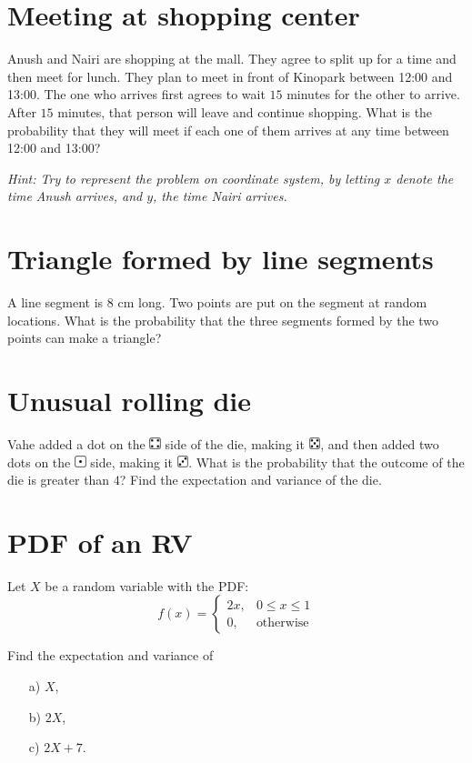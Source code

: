 \section{Meeting at shopping center}
Anush and Nairi are shopping at the mall. They agree to split up for a time and then meet for lunch. They plan to meet in
front of Kinopark between 12:00 and 13:00. The one who arrives first agrees to wait $15$ minutes for the other to arrive. After $15$
minutes, that person will leave and continue shopping. What is the probability that they will meet if each one of them arrives at any time between 12:00 and 13:00?

\textit{Hint: Try to represent the problem on coordinate system, by letting
$x$ denote the time Anush arrives, and $y$, the time Nairi arrives.}

\section{Triangle formed by line segments}
A line segment is $8$ cm long. Two points are put on the segment at
random locations. What is the probability that the three segments formed by
the two points can make a triangle?

\section{Unusual rolling die}
Vahe added a dot on the   \includegraphics[height=0.9em]{figs/4.png} side of the die, making it \includegraphics[height=0.9em]{figs/5.png}, and then added two dots on the \includegraphics[height=0.9em]{figs/1.png} side, making it \includegraphics[height=0.9em]{figs/3.png}.
What is the probability that the outcome of the die is greater than $4$? Find the expectation and variance of the die.

\section{PDF of an RV}
Let $X$ be a random variable with the PDF:
\[
f(x) = \begin{cases}
   2x, & 0 \le x \le 1 \\
   0, & \text{otherwise}
\end{cases}
\]

Find the expectation and variance of
\begin{enumerate}
   \item[a) ] $X$,
   \item[b) ] $2X$,
   \item[c) ] $2X + 7$. 
   
\end{enumerate}